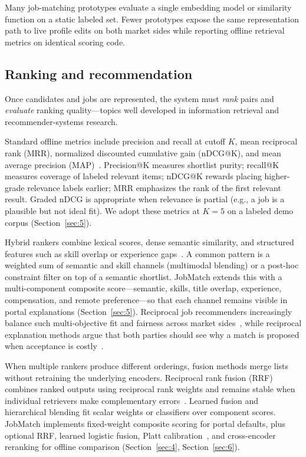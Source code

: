 Many job-matching prototypes evaluate a single embedding model or similarity function on a static labeled set.
Fewer prototypes expose the same representation path to live profile edits on both market sides while reporting offline retrieval metrics on identical scoring code.

\subsection{Ranking and recommendation}\label{sec:2-ranking}

Once candidates and jobs are represented, the system must \emph{rank} pairs and \emph{evaluate} ranking quality---topics well developed in information retrieval and recommender-systems research.

Standard offline metrics include precision and recall at cutoff $K$, mean reciprocal rank (MRR), normalized discounted cumulative gain (nDCG@K), and mean average precision (MAP)~\cite{Manning2008}.
Precision@K measures shortlist purity; recall@K measures coverage of labeled relevant items; nDCG@K rewards placing higher-grade relevance labels earlier; MRR emphasizes the rank of the first relevant result.
Graded nDCG is appropriate when relevance is partial (e.g., a job is a plausible but not ideal fit).
We adopt these metrics at $K{=}5$ on a labeled demo corpus (Section~\ref{sec:5}).

Hybrid rankers combine lexical scores, dense semantic similarity, and structured features such as skill overlap or experience gaps~\cite{Manning2008,Robertson2009,Reimers2019}.
A common pattern is a weighted sum of semantic and skill channels (multimodal blending) or a post-hoc constraint filter on top of a semantic shortlist.
JobMatch extends this with a multi-component composite score---semantic, skills, title overlap, experience, compensation, and remote preference---so that each channel remains visible in portal explanations (Section~\ref{sec:5}).
Reciprocal job recommenders increasingly balance such multi-objective fit and fairness across market sides~\cite{Xia2019WERec}, while reciprocal explanation methods argue that both parties should see why a match is proposed when acceptance is costly~\cite{Kleinerman2018Reciprocal}.

When multiple rankers produce different orderings, fusion methods merge lists without retraining the underlying encoders.
Reciprocal rank fusion (RRF) combines ranked outputs using reciprocal rank weights and remains stable when individual retrievers make complementary errors~\cite{Cormack2009}.
Learned fusion and hierarchical blending fit scalar weights or classifiers over component scores.
JobMatch implements fixed-weight composite scoring for portal defaults, plus optional RRF, learned logistic fusion, Platt calibration~\cite{Platt1999}, and cross-encoder reranking for offline comparison (Section~\ref{sec:4}, Section~\ref{sec:6}).

